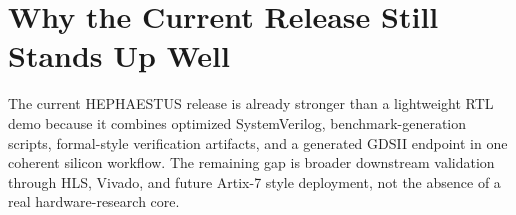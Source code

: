 \documentclass[10pt, conference]{IEEEtran}
\begin{document}
\section{Why the Current Release Still Stands Up Well}
The current HEPHAESTUS release is already stronger than a lightweight RTL demo
because it combines optimized SystemVerilog, benchmark-generation scripts,
formal-style verification artifacts, and a generated GDSII endpoint in one
coherent silicon workflow. The remaining gap is broader downstream validation
through HLS, Vivado, and future Artix-7 style deployment, not the absence of a
real hardware-research core.
\end{document}
